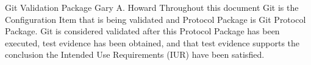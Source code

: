 \documentclass[10pt]{tlc-article}
\begin{document}
  \global\def\configurationitem{Git}

  \tlcTitlePageAndTableOfContents
    {Git Validation Package}
    {Gary A. Howard}
    {Throughout this document Git is the Configuration Item that is being
     validated and Protocol Package is Git Protocol Package.  Git is
     considered validated after this Protocol Package has been executed, test
     evidence has been obtained, and that test evidence supports the conclusion
     the Intended Use Requirements (IUR) have been satisfied.}

  
\end{document}
